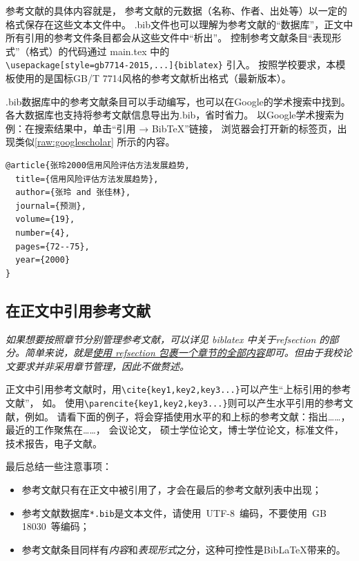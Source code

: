 参考文献的具体内容就是，
参考文献的元数据（名称、作者、出处等）以一定的格式保存在这些文本文件中。
.bib文件也可以理解为参考文献的“数据库”，正文中所有引用的参考文件条目都会从这些文件中“析出”。
控制参考文献条目“表现形式”（格式）的代码通过 main.tex 中的 \\ \verb|\usepackage[style=gb7714-2015,...]{biblatex}| 引入。
按照学校要求，本模板使用的是国标GB/T 7714风格的参考文献析出格式（最新版本）。

.bib数据库中的参考文献条目可以手动编写，也可以在Google的学术搜索中找到。
各大数据库也支持将参考文献信息导出为.bib，省时省力。
以Google学术搜索为例：在搜索结果中，单击“引用 → BibTeX”链接，
浏览器会打开新的标签页，出现类似\cref{raw:googlescholar} 所示的内容。

\begin{lstlisting}[caption={从Google Scholar找到的，但并不规范的.bib条目}, label=raw:googlescholar, float, escapeinside="", numbers=none]
@article{张玲2000信用风险评估方法发展趋势,
  title={信用风险评估方法发展趋势},
  author={张玲 and 张佳林},
  journal={预测},
  volume={19},
  number={4},
  pages={72--75},
  year={2000}
}
\end{lstlisting}

\subsection{在正文中引用参考文献}

\textit{如果想要按照章节分别管理参考文献，可以详见 biblatex 中关于refsection 的部分。简单来说，就是\href{https://bithesis.bitnp.net/faq/bib-split.html}{使用 refsection 包裹一个章节的全部内容}即可。但由于我校论文要求并非采用章节管理，因此不做赘述。}

正文中引用参考文献时\cite{Jiang2005Size}，用\verb+\cite{key1,key2,key3...}+可以产生“上标引用的参考文献”，
如\cite{Meta_CN,chen2007act,DPMG}。
使用\verb+\parencite{key1,key2,key3...}+则可以产生水平引用的参考文献，例如\parencite{JohnD,zhubajie,IEEE-1363}。
请看下面的例子，将会穿插使用水平的和上标的参考文献：\parencite{Meta_CN,JohnD,IEEE-1363}指出……，最近的工作\cite{chen2007act,chen2007ewi}聚焦在……，
会议论文\cite{DPMG,kocher99,cnproceed}，
硕士学位论文\cite{zhubajie,metamori2004}，博士学位论文\cite{shaheshang,FistSystem01,bai2008}，标准文件\cite{IEEE-1363}，技术报告\cite{NPB2}，电子文献\cite{xiaoyu2001, CHRISTINE1998}。

最后总结一些注意事项：
\begin{itemize}
\item  参考文献只有在正文中被引用了，才会在最后的参考文献列表中出现；
\item  参考文献数据库\texttt{*.bib}是文本文件，请使用~UTF-8~编码，不要使用~GB 18030~等编码；
\item  参考文献条目同样有\emph{内容}和\emph{表现形式}之分，这种可控性是BibLaTeX带来的。
\end{itemize}


